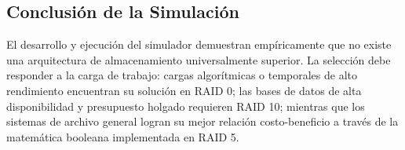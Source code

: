 \documentclass[12pt, a4paper]{article}
\begin{document}
\subsection{Conclusión de la Simulación}
El desarrollo y ejecución del simulador demuestran empíricamente que no existe una arquitectura de almacenamiento universalmente superior. La selección debe responder a la carga de trabajo: cargas algorítmicas o temporales de alto rendimiento encuentran su solución en RAID 0; las bases de datos de alta disponibilidad y presupuesto holgado requieren RAID 10; mientras que los sistemas de archivo general logran su mejor relación costo-beneficio a través de la matemática booleana implementada en RAID 5.
\end{document}
